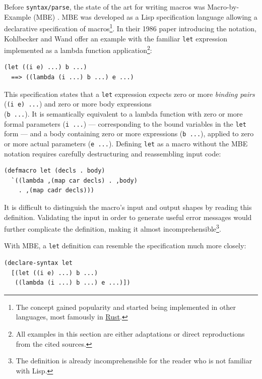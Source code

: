 \documentclass{juliacon}
\begin{document}
Before \texttt{syntax/parse}, the state of the art for writing macros was
Macro-by-Example (MBE) \cite{mbe}. MBE was developed as a Lisp
specification language allowing a declarative specification of
macros\footnote{The concept gained popularity and started being implemented in
other languages, most famously in \href{https://doc.rust-lang.org/reference/macros-by-example.html}{Rust}.}. In their 1986 paper introducing the notation,
Kohlbecker and Wand offer an example with the familiar \texttt{let}
expression implemented as a lambda function application\footnote{All examples in this section are either adaptations or direct
reproductions from the cited sources.}:

\begin{lstlisting}[language=racket]
(let ((i e) ...) b ...)
  ==> ((lambda (i ...) b ...) e ...)
\end{lstlisting}

This specification states that a \texttt{let} expression expects zero or more
\emph{binding pairs} (\texttt{(i e) ...}) and zero or more body expressions \\ (\texttt{b ...}). It is semantically equivalent to a lambda function with zero or
more formal parameters (\texttt{i ...}) — corresponding to the bound
variables in the \texttt{let} form — and a body containing zero or more
expressions (\texttt{b ...}), applied to zero or more actual parameters (\texttt{e ...}). Defining \texttt{let} as a macro without the MBE notation requires
carefully destructuring and reassembling input code:

\begin{lstlisting}[language=racket]
(defmacro let (decls . body)
  `((lambda ,(map car decls) . ,body)
    . ,(map cadr decls)))
\end{lstlisting}

It is difficult to distinguish the macro's input and output shapes by
reading this definition. Validating the input in order to generate
useful error messages would further complicate the definition, making
it almost incomprehensible\footnote{The definition is already incomprehensible for the reader who
is not familiar with Lisp.}.

With MBE, a \texttt{let} definition can resemble the specification much more
closely:

\begin{lstlisting}[language=racket]
(declare-syntax let
  [(let ((i e) ...) b ...)
   ((lambda (i ...) b ...) e ...)])
\end{lstlisting}
\end{document}
